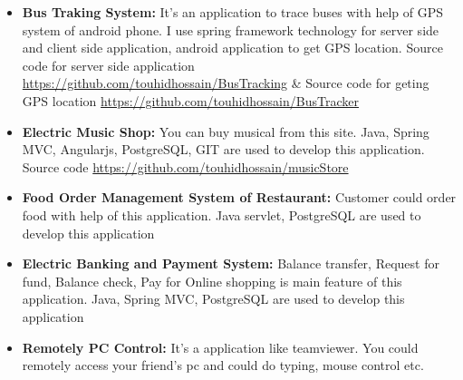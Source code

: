 

\begin{itemize}

	\item
	{\textbf{Bus Traking System:} It's an application to trace buses with help of GPS system of android phone. I use spring framework technology for server side and client side application, android application to get GPS location. Source code for server side application \underline{https://github.com/touhidhossain/BusTracking} \& Source code for geting GPS location \underline{https://github.com/touhidhossain/BusTracker} }
	
	\item
	{\textbf{Electric Music Shop:} You can buy musical from this site. Java, Spring MVC, Angularjs, PostgreSQL, GIT are used to develop this application. Source code \underline{https://github.com/touhidhossain/musicStore} }
	
	\item
	{\textbf{Food Order Management System of Restaurant:} Customer could order food with help of this application. Java servlet, PostgreSQL are used to develop this application}
	
	\item
	{\textbf{Electric Banking and Payment System:} Balance transfer, Request for fund, Balance check, Pay for Online shopping is main feature of this application. Java, Spring MVC, PostgreSQL are used to develop this application}
	
	\item
	{\textbf{Remotely PC Control:} It's a application like teamviewer. You could remotely access your friend’s pc and could do typing, mouse control etc.}
	
\end{itemize}